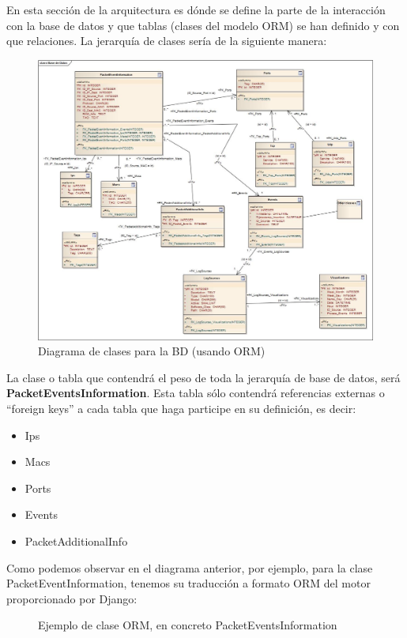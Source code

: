 En esta sección de la arquitectura es dónde se define la parte de la interacción con la base de datos y que tablas (clases del modelo ORM) se han definido y con que relaciones. La jerarquía de clases sería de la siguiente manera: \\
\newpage
\begin{figure}[H]
\includegraphics[scale=.35]{diagramas/bd.jpg}
\caption{Diagrama de clases para la BD (usando ORM)}
\end{figure}

La clase o tabla que contendrá el peso de toda la jerarquía de base de datos, será \textbf{PacketEventsInformation}. Esta tabla sólo contendrá referencias externas o ``foreign keys'' a cada tabla que haga participe en su definición, es decir:
\begin{itemize}
\item Ips
\item Macs
\item Ports
\item Events
\item PacketAdditionalInfo
\end{itemize}

Como podemos observar en el diagrama anterior, por ejemplo, para la clase PacketEventInformation, tenemos su traducción a formato ORM del motor proporcionado por Django:

\begin{figure}[H]

\caption{Ejemplo de clase ORM, en concreto PacketEventsInformation}
\end{figure}

